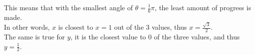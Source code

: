 \documentclass[preview]{standalone}
\begin{document}
\begin{center}
This means that with the smallest angle of $\theta = \frac{1}{6} \pi$, the least amount of progress is made. \\ In other words, $x$ is closest to $x=1$ out of the 3 values, thus $x = \frac{\sqrt{3}}{2}$. \\ The same is true for $y$, it is the closest value to 0 of the three values, and thus $y = \frac{1}{2}$.
\end{center}
\end{document}

